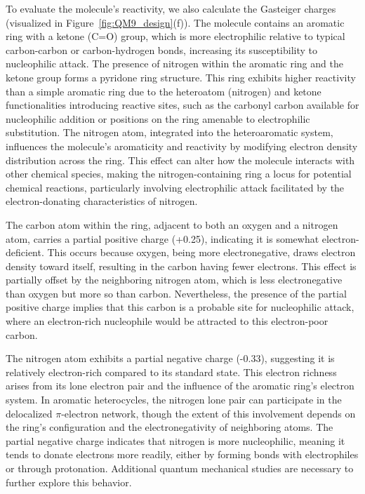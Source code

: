To evaluate the molecule’s reactivity, we also calculate the Gasteiger charges~\cite{Gasteiger1980IterativeCharges} (visualized in Figure~\ref{fig:QM9_design}(f)). The molecule contains an aromatic ring with a ketone (C=O) group, which is more electrophilic relative to typical carbon-carbon or carbon-hydrogen bonds, increasing its susceptibility to nucleophilic attack. The presence of nitrogen within the aromatic ring and the ketone group forms a pyridone ring structure. This ring exhibits higher reactivity than a simple aromatic ring due to the heteroatom (nitrogen) and ketone functionalities introducing reactive sites, such as the carbonyl carbon available for nucleophilic addition or positions on the ring amenable to electrophilic substitution. The nitrogen atom, integrated into the heteroaromatic system, influences the molecule’s aromaticity and reactivity by modifying electron density distribution across the ring. This effect can alter how the molecule interacts with other chemical species, making the nitrogen-containing ring a locus for potential chemical reactions, particularly involving electrophilic attack facilitated by the electron-donating characteristics of nitrogen.

The carbon atom within the ring, adjacent to both an oxygen and a nitrogen atom, carries a partial positive charge (+0.25), indicating it is somewhat electron-deficient. This occurs because oxygen, being more electronegative, draws electron density toward itself, resulting in the carbon having fewer electrons. This effect is partially offset by the neighboring nitrogen atom, which is less electronegative than oxygen but more so than carbon. Nevertheless, the presence of the partial positive charge implies that this carbon is a probable site for nucleophilic attack, where an electron-rich nucleophile would be attracted to this electron-poor carbon.

The nitrogen atom exhibits a partial negative charge (-0.33), suggesting it is relatively electron-rich compared to its standard state. This electron richness arises from its lone electron pair and the influence of the aromatic ring's electron system. In aromatic heterocycles, the nitrogen lone pair can participate in the delocalized $\pi$-electron network, though the extent of this involvement depends on the ring's configuration and the electronegativity of neighboring atoms. The partial negative charge indicates that nitrogen is more nucleophilic, meaning it tends to donate electrons more readily, either by forming bonds with electrophiles or through protonation. Additional quantum mechanical studies are necessary to further explore this behavior.

